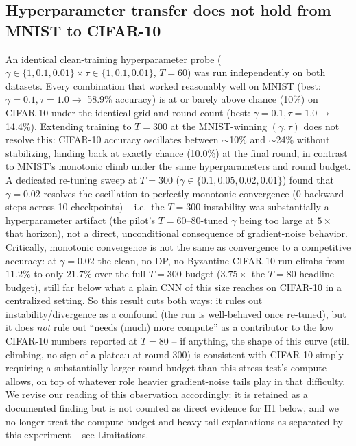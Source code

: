 \documentclass{article}
\begin{document}
\subsection{Hyperparameter transfer does not hold from MNIST to CIFAR-10}
An identical clean-training hyperparameter probe ($\gamma\in\{1,0.1,0.01\}\times
\tau\in\{1,0.1,0.01\}$, $T{=}60$) was run independently on both datasets. Every
combination that worked reasonably well on MNIST (best: $\gamma{=}0.1,\tau{=}1.0
\to$ 58.9\% accuracy) is at or barely above chance (10\%) on CIFAR-10 under the
identical grid and round count (best: $\gamma{=}0.1,\tau{=}1.0\to$ 14.4\%).
Extending training to $T{=}300$ at the MNIST-winning $(\gamma,\tau)$ does not
resolve this: CIFAR-10 accuracy oscillates between $\sim$10\% and $\sim$24\%
without stabilizing, landing back at exactly chance (10.0\%) at the final round,
in contrast to MNIST's monotonic climb under the same hyperparameters and round
budget. A dedicated re-tuning sweep at $T{=}300$
($\gamma\in\{0.1,0.05,0.02,0.01\}$) found that $\gamma{=}0.02$ resolves the
oscillation to perfectly monotonic convergence (0 backward steps across 10
checkpoints) -- i.e.\ the $T{=}300$ instability was substantially a
hyperparameter artifact (the pilot's $T{=}60$--$80$-tuned $\gamma$ being too
large at $5\times$ that horizon), not a direct, unconditional consequence of
gradient-noise behavior. Critically, monotonic convergence is not the same as
convergence to a competitive accuracy: at $\gamma{=}0.02$ the clean,
no-DP, no-Byzantine CIFAR-10 run climbs from $11.2\%$ to only $21.7\%$ over
the full $T{=}300$ budget ($3.75\times$ the $T{=}80$ headline budget), still
far below what a plain CNN of this size reaches on CIFAR-10 in a
centralized setting. So this result cuts both ways: it rules out
instability/divergence as a confound (the run is well-behaved once
re-tuned), but it does \emph{not} rule out ``needs (much) more compute''
as a contributor to the low CIFAR-10 numbers reported at $T{=}80$ --
if anything, the shape of this curve (still climbing, no sign of a plateau
at round 300) is consistent with CIFAR-10 simply requiring a substantially
larger round budget than this stress test's compute allows, on top of
whatever role heavier gradient-noise tails play in that difficulty. We
revise our reading of this observation accordingly: it is retained as a
documented finding but is not counted as direct evidence for H1 below, and
we no longer treat the compute-budget and heavy-tail explanations as
separated by this experiment -- see Limitations.
\end{document}

